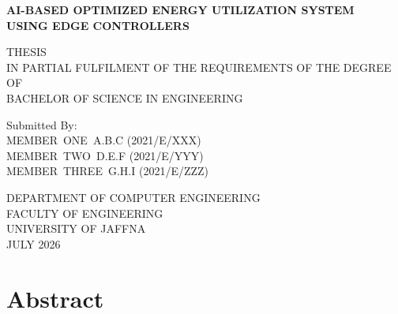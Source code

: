 \documentclass[10pt,a4paper,twocolumn]{article}
\begin{document}
\onecolumn
\begin{titlepage}
    \centering
    \vspace*{2cm}

    {\LARGE\bfseries AI-BASED OPTIMIZED ENERGY UTILIZATION SYSTEM \\[0.3cm]
    USING EDGE CONTROLLERS}

    \vspace{2cm}

    {\large THESIS}\\[0.4cm]
    {\normalsize IN PARTIAL FULFILMENT OF THE REQUIREMENTS OF THE DEGREE OF}\\[0.2cm]
    {\normalsize BACHELOR OF SCIENCE IN ENGINEERING}

    \vspace{2cm}

    {\normalsize Submitted By:}\\[0.5cm]
    {\normalsize MEMBER~ONE~A.B.C (2021/E/XXX)}\\[0.2cm]
    {\normalsize MEMBER~TWO~D.E.F (2021/E/YYY)}\\[0.2cm]
    {\normalsize MEMBER~THREE~G.H.I (2021/E/ZZZ)}

    \vfill

    {\normalsize DEPARTMENT OF COMPUTER ENGINEERING}\\[0.2cm]
    {\normalsize FACULTY OF ENGINEERING}\\[0.2cm]
    {\normalsize UNIVERSITY OF JAFFNA}\\[0.5cm]
    {\normalsize JULY 2026}
\end{titlepage}

\tableofcontents
\thispagestyle{fancy}

\newpage
\twocolumn

\section*{Abstract}
\end{document}
